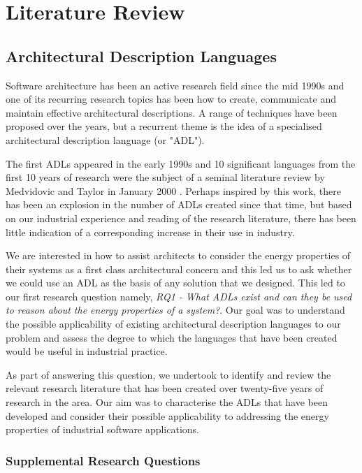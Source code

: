 \chapter{Literature Review} \label{chapter:lit-review}

\section{Architectural Description Languages} \label{sec:adl-lit-review}

Software architecture has been an active research field since the mid 1990s and one of its recurring research topics has been how to create, communicate and maintain effective architectural descriptions.  A range of techniques have been proposed over the years, but a recurrent theme is the idea of a specialised architectural description language (or "ADL").

The first ADLs appeared in the early 1990s and 10 significant languages from the first 10 years of research were the subject of a seminal literature review by Medvidovic and Taylor in January 2000 \cite{medvidovic2000-adlcomparison}.  Perhaps inspired by this work, there has been an explosion in the number of ADLs created since that time, but based on our industrial experience and reading of the research literature, there has been little indication of a corresponding increase in their use in industry.  

We are interested in how to assist architects to consider the energy properties of their systems as a first class architectural concern and this led us to ask whether we could use an ADL as the basis of any solution that we designed.   This led to our first research question namely, \emph{RQ1 - What ADLs exist and can they be used to reason about the energy properties of a system?}.  Our goal was to understand the possible applicability of existing architectural description languages to our problem and assess the degree to which the languages that have been created would be useful in industrial practice.

As part of answering this question, we undertook to identify and review the relevant research literature that has been created over twenty-five years of research in the area.  Our aim was to characterise the ADLs that have been developed and consider their possible applicability to addressing the energy properties of industrial software applications.

\subsection{Supplemental Research Questions}

